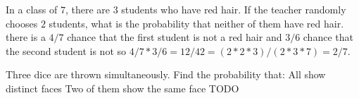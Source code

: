 \begin{ExerciseList}
\Exercise In a class of $7$, there are $3$ students who have red hair. If the teacher randomly chooses $2$ students, what is the probability that neither of them have red hair.
\Answer there is a $4/7$ chance that the first student is not a red hair and $3/6$ chance that the second student is not so $4/7 * 3/6 = 12/42 = (2*2*3)/(2*3*7) = 2/7$.

\Exercise Three dice are thrown simultaneously. Find the probability that:
\Question All show distinct faces
\Question Two of them show the same face
\Answer TODO %

\end{ExerciseList}
